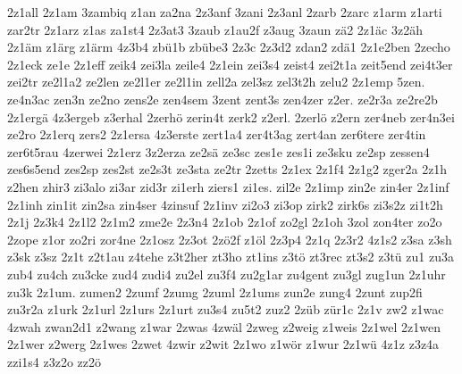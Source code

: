 {2z1all
2z1am
3zambiq
z1an
za2na
2z3anf
3zani
2z3anl
2zarb
2zarc
z1arm
z1arti
zar2tr
2z1arz
z1as
za1st4
2z3at3
3zaub
z1au2f
z3aug
3zaun
zä2
2z1äc
3z2äh
2z1äm
z1ärg
z1ärm
4z3b4
zbü1b
zbübe3
2z3c
2z3d2
zdan2
zdä1
2z1e2ben
2zecho
2z1eck
ze1e
2z1eff
zeik4
zei3la
zeile4
2z1ein
zei3s4
zeist4
zei2t1a
zeit5end
zei4t3er
zei2tr
ze2l1a2
ze2len
ze2l1er
ze2l1in
zell2a
zel3sz
zel3t2h
zelu2
2z1emp
5zen.
ze4n3ac
zen3n
ze2no
zens2e
zen4sem
3zent
zent3s
zen4zer
z2er.
ze2r3a
ze2re2b
2z1ergä
4z3ergeb
z3erhal
2zerhö
zerin4t
zerk2
z2erl.
2zerlö
z2ern
zer4neb
zer4n3ei
ze2ro
2z1erq
zers2
2z1ersa
4z3erste
zert1a4
zer4t3ag
zert4an
zer6tere
zer4tin
zer6t5rau
4zerwei
2z1erz
3z2erza
ze2sä
ze3sc
zes1e
zes1i
ze3sku
ze2sp
zessen4
zes6s5end
zes2sp
zes2st
ze2s3t
ze3sta
ze2tr
2zetts
2z1ex
2z1f4
2z1g2
zger2a
2z1h
z2hen
zhir3
zi3alo
zi3ar
zid3r
zi1erh
ziers1
zi1es.
zil2e
2z1imp
zin2e
zin4er
2z1inf
2z1inh
zin1it
zin2sa
zin4ser
4zinsuf
2z1inv
zi2o3
zi3op
zirk2
zirk6s
zi3s2z
zi1t2h
2z1j
2z3k4
2z1l2
2z1m2
zme2e
2z3n4
2z1ob
2z1of
zo2gl
2z1oh
3zol
zon4ter
zo2o
2zope
z1or
zo2ri
zor4ne
2z1osz
2z3ot
2zö2f
z1öl
2z3p4
2z1q
2z3r2
4z1s2
z3sa
z3sh
z3sk
z3sz
2z1t
z2t1au
z4tehe
z3t2her
zt3ho
zt1ins
z3tö
zt3rec
zt3s2
z3tü
zu1
zu3a
zub4
zu4ch
zu3cke
zud4
zudi4
zu2el
zu3f4
zu2g1ar
zu4gent
zu3gl
zug1un
2z1uhr
zu3k
2z1um.
zumen2
2zumf
2zumg
2zuml
2z1ums
zun2e
zung4
2zunt
zup2fi
zu3r2a
z1urk
2z1url
2z1urs
2z1urt
zu3s4
zu5t2
zuz2
2züb
zür1c
2z1v
zw2
z1wac
4zwah
zwan2d1
z2wang
z1war
2zwas
4zwäl
2zweg
z2weig
z1weis
2z1wel
2z1wen
2z1wer
z2werg
2z1wes
2zwet
4zwir
z2wit
2z1wo
z1wör
z1wur
2z1wü
4z1z
z3z4a
zzi1s4
z3z2o
zz2ö
}

\endinput

